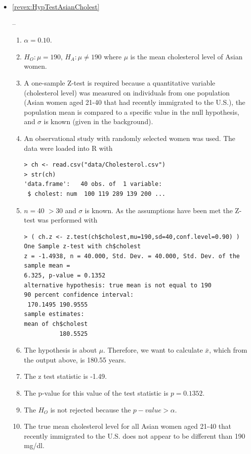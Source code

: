 \documentclass[10pt,openany]{book}\usepackage[]{graphicx}\usepackage[]{color}
\makeatletter
\newenvironment{kframe}{%
 \def\at@end@of@kframe{}%
 \ifinner\ifhmode%
  \def\at@end@of@kframe{\end{minipage}}%
  \begin{minipage}{\columnwidth}%
 \fi\fi%
 \def\FrameCommand##1{\hskip\@totalleftmargin \hskip-\fboxsep
 \colorbox{shadecolor}{##1}\hskip-\fboxsep
     \hskip-\linewidth \hskip-\@totalleftmargin \hskip\columnwidth}%
 \MakeFramed {\advance\hsize-\width
   \@totalleftmargin\z@ \linewidth\hsize
   \@setminipage}}%
 {\par\unskip\endMakeFramed%
 \at@end@of@kframe}
\newenvironment{knitrout}{}{} %
\makeatother
\begin{document}
\begin{itemize}
  \item \hypertarget{ans:HypTestZAsianCholest}{\ref{revex:HypTestAsianCholest}} --
    \begin{enumerate}
      \item $\alpha=0.10$.
      \item $H_{O}:\mu=190$, $H_{A}:\mu\neq190$ where $\mu$ is the mean cholesterol level of Asian women.
      \item A one-sample Z-test is required because a quantitative variable (cholesterol level) was measured on individuals from one population (Asian women aged 21-40 that had recently immigrated to the U.S.), the population mean is compared to a specific value in the null hypothesis, and $\sigma$ is known (given in the background).
      \item An observational study with randomly selected women was used.  The data were loaded into R with
\begin{knitrout}
\color{fgcolor}\begin{kframe}
\begin{verbatim}
> ch <- read.csv("data/Cholesterol.csv")
> str(ch)
'data.frame':	40 obs. of  1 variable:
 $ cholest: num  100 119 289 139 200 ...
\end{verbatim}
\end{kframe}
\end{knitrout}
      \item $n=$40 $>30$ and $\sigma$ is known.  As the assumptions have been met the Z-test was performed with
\begin{knitrout}
\color{fgcolor}\begin{kframe}
\begin{verbatim}
> ( ch.z <- z.test(ch$cholest,mu=190,sd=40,conf.level=0.90) )
One Sample z-test with ch$cholest 
z = -1.4938, n = 40.000, Std. Dev. = 40.000, Std. Dev. of the sample mean =
6.325, p-value = 0.1352
alternative hypothesis: true mean is not equal to 190 
90 percent confidence interval:
 170.1495 190.9555 
sample estimates:
mean of ch$cholest 
          180.5525 
\end{verbatim}
\end{kframe}
\end{knitrout}
      \item The hypothesis is about $\mu$.  Therefore, we want to calculate $\bar{x}$, which from the output above, is 180.55 years.
      \item The z test statistic is -1.49.
      \item The p-value for this value of the test statistic is $p=0.1352$.
      \item The $H_{O}$ is not rejected because the $p-value>\alpha$.
      \item The true mean cholesterol level for all Asian women aged 21-40 that recently immigrated to the U.S. does not appear to be different than 190 mg/dl.
    \end{enumerate}
\end{itemize}
\end{document}
